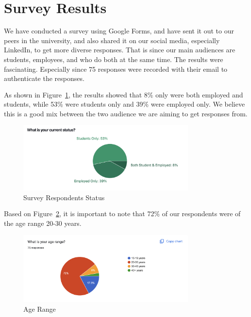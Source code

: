 \documentclass[12pt,a4paper]{report}
\begin{document}
\section{Survey Results}

We have conducted a survey using Google Forms, and have sent it out to our peers in the university, and also shared it on our social media, especially LinkedIn, to get more diverse responses. That is since our main audiences are students, employees, and who do both at the same time. The results were fascinating. Especially since 75 responses were recorded with their email to authenticate the responses.

As shown in Figure~\ref{fig:survey-status}, the results showed that 8\% only were both employed and students, while 53\% were students only and 39\% were employed only. We believe this is a good mix between the two audience we are aiming to get responses from.

\begin{figure}[!h]
    \centering
    \includegraphics[width=0.8\textwidth]{images/survey/status.png}
    \caption{Survey Respondents Status}
    \label{fig:survey-status}
\end{figure}

Based on Figure~\ref{fig:age-range}, it is important to note that 72\% of our respondents were of the age range 20-30 years.

\begin{figure}[!h]
    \centering
    \includegraphics[width=0.8\textwidth]{images/survey/age.png}
    \caption{Age Range}
    \label{fig:age-range}
\end{figure}
\end{document}
